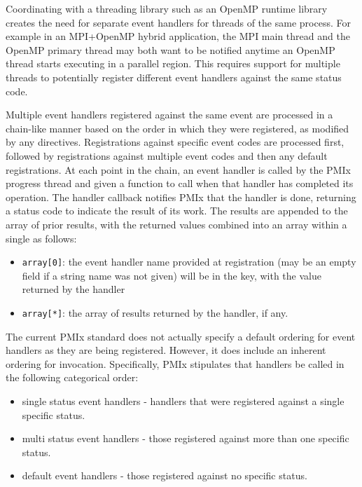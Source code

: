 Coordinating with a threading library such as an OpenMP runtime library creates the need for separate event handlers for threads of the same process.  For example in an MPI+OpenMP hybrid application, the MPI main thread and the OpenMP primary thread may both want to be notified anytime an OpenMP thread starts executing in a parallel region.  This requires support for multiple threads to potentially register different event handlers against the same status code.

Multiple event handlers registered against the same event are processed in a chain-like manner based on the order in which they were registered, as modified by any directives. Registrations against specific event codes are processed first, followed by registrations against multiple event codes and then any default registrations. At each point in the chain, an event handler is called by the PMIx progress thread and given a function to call when that handler has completed its operation. The handler callback notifies PMIx that the handler is done, returning a status code to indicate the result of its work. The results are appended to the array of prior results, with the returned values combined into an array within a single  as follows:
\begin{itemize}
\item \texttt{array[0]}: the event handler name provided at registration (may be an empty field if a string name was not given) will be in the key, with the  value returned by the handler
\item \texttt{array[*]}: the array of results returned by the handler, if any.
\end{itemize}

The current PMIx standard does not actually specify a default ordering for event handlers as they are being registered. However, it does include an inherent ordering for invocation. Specifically, PMIx stipulates that handlers be called in the following categorical order:

\begin{itemize}
\item single status event handlers - handlers that were registered against a single specific status.
\item multi status event handlers - those registered against more than one specific status.
\item default event handlers - those registered against no specific status.
\end{itemize}

